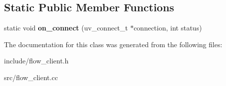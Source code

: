 \subsection*{Static Public Member Functions}
\begin{DoxyCompactItemize}
\item 
static void {\bfseries on\+\_\+connect} (uv\+\_\+connect\+\_\+t $\ast$connection, int status)\hypertarget{classflow_1_1_flow_client_a94162b68f527cb032f1319d28c164a95}{}\label{classflow_1_1_flow_client_a94162b68f527cb032f1319d28c164a95}

\end{DoxyCompactItemize}


The documentation for this class was generated from the following files\+:\begin{DoxyCompactItemize}
\item 
include/flow\+\_\+client.\+h\item 
src/flow\+\_\+client.\+cc\end{DoxyCompactItemize}
